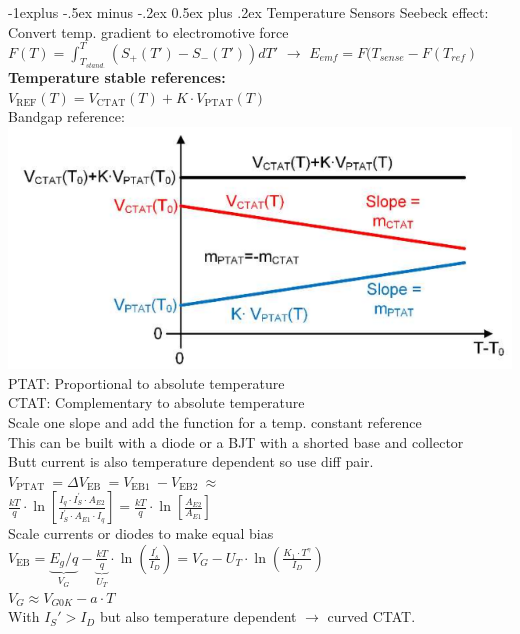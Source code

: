 \documentclass[5pt,landscape]{article}
\makeatletter
\renewcommand{\subsection}{\@startsection{subsection}{2}{0mm}%
                                {-1explus -.5ex minus -.2ex}%
                                {0.5ex plus .2ex}%
                                {\normalfont\normalsize\bfseries}}
\makeatother
\begin{document}
\begin{multicols*}{5}
\subsection{Temperature Sensors}
Seebeck effect: Convert temp. gradient to electromotive force
$ F(T)  \hat{=} \int_{T_{stand.}}^{T} (S_{+} (T') - S_- (T')) dT'   $ $ \rightarrow $ $ E_{emf} = F(T_{sense} - F(T_{ref})$
\textbf{Temperature stable references:}\\
$ V_{\mathrm{REF}}(T)=V_{\mathrm{CTAT}}(T)+K \cdot V_{\mathrm{PTAT}}(T) $\\
Bandgap reference:
\includegraphics[width=\columnwidth]{images/bandgapreference.png}
PTAT: Proportional to absolute temperature\\
CTAT: Complementary to absolute temperature\\
Scale one slope and add the function for a temp. constant reference\\
This can be built with a diode or a BJT with a shorted base and collector\\
Butt current is also temperature dependent so use diff pair.
$ V_{\text {PTAT }}=\Delta V_{\text {EB }}=V_{\text {EB1 }}-V_{\text {EB2 }} \approx $\\
$ \frac{k T}{q} \cdot \ln \left[\frac{I_{q} \cdot I_{S}^{\prime} \cdot A_{E 2}}{I_{S}^{\prime} \cdot A_{E 1} \cdot I_{q}}\right]=\frac{k T}{q} \cdot \ln \left[\frac{A_{E 2}}{A_{E 1}}\right] $\\
Scale currents or diodes to make equal bias\\
$ V_{\mathrm{EB}}=\underbrace{E_{g} / q}_{V_{G}}-\underbrace{\frac{k T}{q}}_{U_{T}} \cdot \ln \left(\frac{I_{s}^{\prime}}{I_{D}}\right)=V_{G}-U_{T} \cdot \ln \left(\frac{K_{1} \cdot T^{\gamma}}{I_{D}}\right) $\\
$ V_G \approx V_{G0K} - a \cdot T  $\\
With $ I_S' > I_D $ but also temperature dependent $ \rightarrow $ curved CTAT.\\

\end{multicols*}
\end{document}
